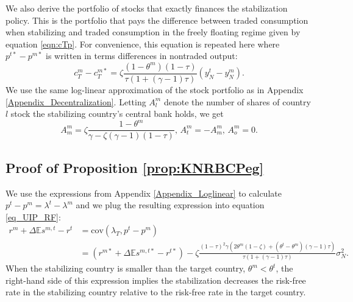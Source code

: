 We also derive the portfolio of stocks that exactly finances the
stabilization policy. This is the portfolio that pays the difference
between traded consumption when stabilizing and traded consumption in
the freely floating regime given by equation \eqref{eqn:cTp}. For
convenience, this equation is repeated here where
$p^{t \ast} - p^{m \ast}$ is written in terms differences in nontraded
output:
\begin{equation*}
  c^m_T - c^{m \ast}_T
  = \zeta
  \frac{(1 - \theta^m)(1 - \tau)}{\tau \left( 1 + (\gamma - 1) \tau \right)}
  \left( y^t_N - y^m_N \right).
\end{equation*}
We use the same log-linear approximation of the stock portfolio as in
Appendix \ref{Appendix_Decentralization}. Letting $A^m_l$ denote the
number of shares of country $l$ stock the stabilizing country's
central bank holds, we get\begin{equation*} A^m_m = \zeta \frac{1 -
    \theta^m}{\gamma - \zeta (\gamma - 1)(1 - \tau)} \text{, } A^m_t =
  - A^m_m \text{, } A^m_o = 0.
\end{equation*}


\subsection{Proof of Proposition
  \ref{prop:KNRBCPeg} \label{Appendix_KNRBCPeg}}

We use the expressions from Appendix \ref{Appendix_Loglinear} to
calculate $p^t - p^m = \lambda^t - \lambda^m$ and we plug the
resulting expression into equation \eqref{eq_UIP_RF}:
\begin{align*}
  r^m + \Delta \mathbb{E}s^{m, t} - r^t
  &= \text{cov}\left( \lambda_T, p^t - p^m \right) \\
  &= \left(r^{m \ast} + \Delta \mathbb{E}s^{m, t \ast} - r^{t \ast} \right)
    - \zeta \frac{(1 - \tau)^2 \gamma \left( 2 \theta^m (1 - \zeta)
    + \left( \theta^t - \theta^m \right) (\gamma - 1) \tau \right)}
    {\tau \left( 1 + (\gamma - 1) \tau \right)} \sigma_N^2.
\end{align*}
When the stabilizing country is smaller than the target country,
$\theta^m < \theta^t$, the right-hand side of this expression implies
the stabilization decreases the risk-free rate in the stabilizing
country relative to the risk-free rate in the target country.


